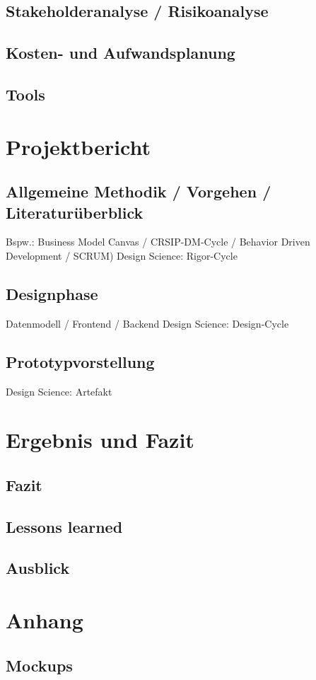 \documentclass[a4paper, 12pt]{article}
\begin{document}
    \subsection{Stakeholderanalyse / Risikoanalyse}
    
    \subsection{Kosten- und Aufwandsplanung}

    \subsection{Tools}\label{subsec:tools}

    \newpage
    
    \section{Projektbericht}
    
    \subsection{Allgemeine Methodik / Vorgehen / Literaturüberblick}
    Bspw.: Business Model Canvas / CRSIP-DM-Cycle / Behavior Driven Development / SCRUM)
    Design Science: Rigor-Cycle
    
    \subsection{Designphase}\label{subsec:designphase}
    Datenmodell / Frontend / Backend
    Design Science: Design-Cycle
    
    \subsection{Prototypvorstellung}
    Design Science: Artefakt

    \newpage
    
    \section{Ergebnis und Fazit}
    
    \subsection{Fazit}
    
    \subsection{Lessons learned}
    
    \subsection{Ausblick}

    \appendix

    \section{Anhang}
    
    \subsection{Mockups}
   
\end{document}
